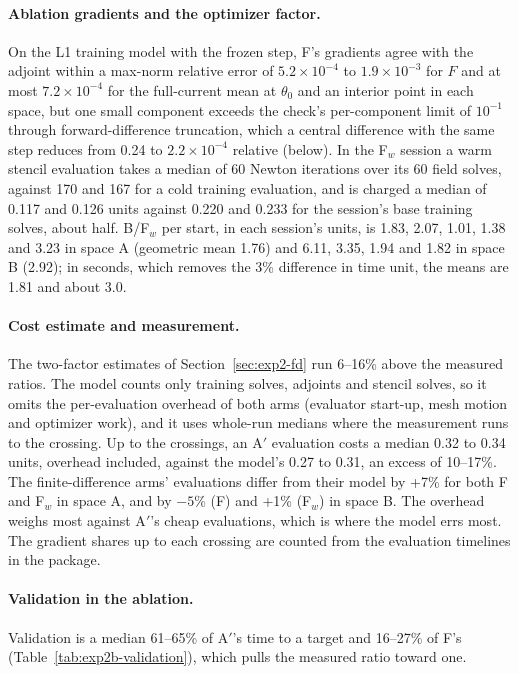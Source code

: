 \documentclass{anvil-paper}
\begin{document}
\paragraph{Ablation gradients and the optimizer factor.}
On the L1 training model with the frozen step, F's gradients agree with the
adjoint within a max-norm relative error of $5.2\times10^{-4}$ to
$1.9\times10^{-3}$ for $F$ and at most $7.2\times10^{-4}$ for the
full-current mean at $\theta_0$ and an interior point in each space, but
one small component exceeds the check's per-component limit of $10^{-1}$
through forward-difference truncation, which a central difference with the
same step reduces from 0.24 to $2.2\times10^{-4}$ relative
(below). In
the F$_w$ session a warm stencil evaluation takes a median of 60 Newton iterations over its 60
field solves, against 170 and 167 for a cold training evaluation, and is
charged a median of 0.117 and
0.126 units against 0.220 and 0.233 for the session's base training solves,
about half. B/F$_w$ per start, in each session's units, is 1.83,
2.07, 1.01, 1.38 and 3.23 in space A (geometric mean 1.76) and 6.11, 3.35,
1.94 and 1.82 in space B (2.92); in seconds, which removes the 3\%
difference in time unit, the means are 1.81 and about 3.0.

\paragraph{Cost estimate and measurement.}
The two-factor estimates of Section~\ref{sec:exp2-fd} run 6--16\% above
the measured ratios. The model counts only training solves, adjoints and
stencil solves, so it omits the per-evaluation overhead of both arms
(evaluator start-up, mesh motion and optimizer work), and it uses
whole-run medians where the measurement runs to the crossing. Up to the
crossings, an A$'$ evaluation costs a median 0.32 to 0.34 units, overhead
included, against the model's 0.27 to 0.31, an excess of 10--17\%. The
finite-difference arms' evaluations differ from their model by +7\% for both
F and F$_w$ in space A, and by $-5$\% (F) and +1\% (F$_w$) in space B. The overhead weighs most against A$'$'s cheap evaluations, which
is where the model errs most. The gradient shares up to
each crossing are counted from the evaluation timelines in the package.

\paragraph{Validation in the ablation.}
Validation is a median 61--65\% of A$'$'s time to
a target and 16--27\% of F's (Table~\ref{tab:exp2b-validation}), which
pulls the measured ratio toward one.
\end{document}
